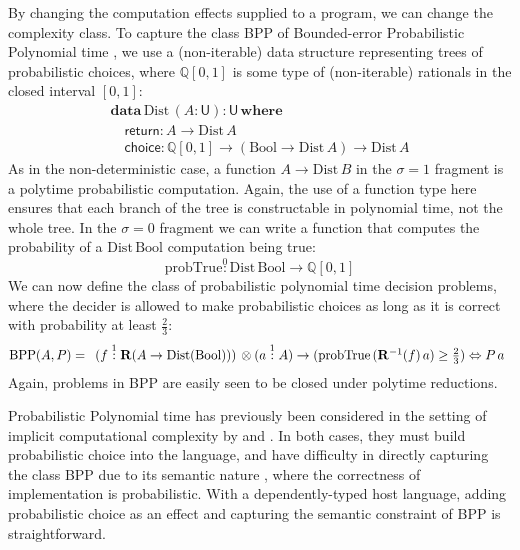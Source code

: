 \documentclass[acmsmall,screen]{acmart}
\newcommand{\BoolTy}{\mathrm{Bool}}
\begin{document}
By changing the computation effects supplied to a program, we can
change the complexity class. To capture the class BPP of Bounded-error
Probabilistic Polynomial time \cite{AroraBarak09}, we use a
(non-iterable) data structure representing trees of probabilistic
choices, where $\mathbb{Q}[0,1]$ is some type of (non-iterable)
rationals in the closed interval $[0,1]$:
\begin{displaymath}
  \begin{array}{l}
    \textbf{data}\,\mathrm{Dist}\,(A : \mathsf{U}) : \mathsf{U}\,\textbf{where} \\
    \quad \mathsf{return} : A \to \mathrm{Dist}\,A \\
    \quad \mathsf{choice} : \mathbb{Q}[0,1] \to (\BoolTy \to \mathrm{Dist}\,A) \to \mathrm{Dist}\,A
  \end{array}
\end{displaymath}
As in the non-deterministic case, a function $A \to \mathrm{Dist}\,B$
in the $\sigma = 1$ fragment is a polytime probabilistic
computation. Again, the use of a function type here ensures that each
branch of the tree is constructable in polynomial time, not the whole
tree. In the $\sigma = 0$ fragment we can write a function that
computes the probability of a $\mathrm{Dist}\,\BoolTy$ computation
being true:
\begin{displaymath}
  \mathrm{probTrue} \stackrel0: \mathrm{Dist}\,\BoolTy \to \mathbb{Q}[0,1]
\end{displaymath}
We can now define the class of probabilistic polynomial time decision
problems, where the decider is allowed to make probabilistic choices
as long as it is correct with probability at least $\frac{2}{3}$:
\begin{displaymath}
  \mathrm{BPP}(A,P) =
  \begin{array}[t]{l}
    (f \stackrel1: \mathbf{R}(A \to \mathrm{Dist}(\BoolTy))) \, \otimes
    (a \stackrel1: A) \to (\mathrm{probTrue}\,(\mathbf{R}^{-1}(f)\,a) \geq \frac{2}{3}) \Leftrightarrow P\,a
  \end{array}
\end{displaymath}
Again, problems in BPP are easily seen to be closed under polytime
reductions.

Probabilistic Polynomial time has previously been considered in the
setting of implicit computational complexity by
\citet{dallago_et_al:LIPIcs.MFCS.2021.35} and \citet{LagoT15}. In both
cases, they must build probabilistic choice into the language, and
have difficulty in directly capturing the class BPP due to its
semantic nature \cite{AroraBarak09}, where the correctness of
implementation is probabilistic. With a dependently-typed host
language, adding probabilistic choice as an effect and capturing the
semantic constraint of BPP is straightforward.
\end{document}
